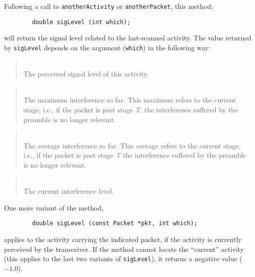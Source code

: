 Following a call to {\tt anotherActivity} or {\tt anotherPacket}, this method:
\begin{verbatim}
        double sigLevel (int which);
\end{verbatim}
\noindent
will return the signal level related to the last-scanned activity.
The value returned by {\tt sigLevel} depends on the argument 
({\tt which}) in the following way:

\begin{quote}
\noindent{}\\ \hspace{0in}
The perceived signal level of this activity.
\end{quote}

\begin{quote}
\noindent{}\\ \hspace{0in}
The maximum interference so far.
This maximum refers to the current stage, i.e.,
if the packet is past stage {\em T}, the interference suffered
by the preamble is no longer relevant.
\end{quote}

\begin{quote}
\noindent{}\\ \hspace{0in}
The average interference so far.
This average refers to the current stage, i.e.,
if the packet is past stage {\em T\/} the interference suffered
by the preamble is no longer relevant.
\end{quote}

\begin{quote}
\noindent{}\\ \hspace{0in}
The current interference level.
\end{quote}

One more variant of the method,
\begin{verbatim}
        double sigLevel (const Packet *pkt, int which);
\end{verbatim}
\noindent
applies to the activity carrying the indicated packet, if the activity is
currently perceived by the transceiver.
If the method cannot locate the ``current'' activity (this applies to the
last two variants of {\tt sigLevel}), it returns a negative value ($-1.0$).

